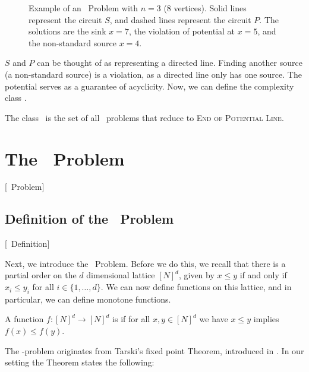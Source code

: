 \begin{figure}[ht]
	\centering
	\caption[Example of an \EOPL\ Problem]{Example of an \EOPL\ Problem with $n=3$ (8 vertices).
		Solid lines represent the circuit $S$, and dashed lines represent the circuit $P$.
		The solutions are the sink $x=7$, the violation of potential at $x=5$, and the non-standard source $x=4$.}
	\label{fig:eopl_example}
\end{figure}

$S$ and $P$ can be thought of as representing a directed line. Finding another source (a non-standard source) is a violation, as a directed line only has one source. The potential serves as a guarantee of acyclicity. Now, we can define the complexity class \EOPL.

\begin{definition}[\EOPL]
	The class \EOPL\ is the set of all \TFNP\ problems that reduce to \textsc{End of Potential Line}.
\end{definition}

\section{The \Tarski\ Problem}[\Tarski\ Problem]
\label{sec:tarski_problem}

\subsection{Definition of the \Tarski\ Problem}[\Tarski\ Definition]

Next, we introduce the \Tarski\ Problem. Before we do this, we recall that there is a partial order on the $d$ dimensional lattice ${[N]}^d$, given by $x \leq y$ if and only if $x_i \leq y_i$ for all $i \in \{1, \dots, d\}$. We can now define functions on this lattice, and in particular, we can define monotone functions.

\begin{definition}
	A function $f : {[N]}^d \rightarrow {[N]}^d$ is  if for all $x, y \in {[N]}^d$ we have $x \leq y$ implies $f(x) \leq f(y)$.
\end{definition}

The \Tarski-problem originates from Tarski's fixed point Theorem, introduced in . In our setting the Theorem states the following:

